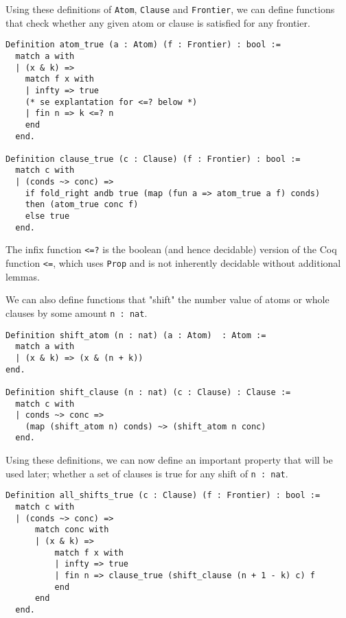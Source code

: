 Using these definitions of \lstinline{Atom}, \lstinline{Clause} and \lstinline{Frontier},
we can define functions that check whether any given atom or clause is satisfied for any frontier.

\begin{minipage}{\linewidth}
\begin{lstlisting}[language=Coq, label={lst:atom_clause_true_def}, caption={\lstinline{atom_true} and \lstinline{clause_true} in Coq}]
Definition atom_true (a : Atom) (f : Frontier) : bool :=
  match a with
  | (x & k) =>
    match f x with
    | infty => true
    (* se explantation for <=? below *)
    | fin n => k <=? n
    end
  end.

Definition clause_true (c : Clause) (f : Frontier) : bool :=
  match c with
  | (conds ~> conc) =>
    if fold_right andb true (map (fun a => atom_true a f) conds)
    then (atom_true conc f)
    else true
  end.
\end{lstlisting}
\end{minipage}

The infix function \lstinline{<=?} is the boolean (and hence decidable) version of the
Coq function \lstinline{<=}, which uses \lstinline{Prop} and is not inherently decidable without
additional lemmas.

We can also define functions that "shift" the number value of atoms or whole clauses by some amount \lstinline{n : nat}.

\begin{minipage}{\linewidth}
\begin{lstlisting}[language=Coq, label={lst:shift_atom_clause_true}, caption={\lstinline{shift_atom} and \lstinline{shift_clause} in Coq}]
Definition shift_atom (n : nat) (a : Atom)  : Atom :=
  match a with
  | (x & k) => (x & (n + k))
end.

Definition shift_clause (n : nat) (c : Clause) : Clause :=
  match c with
  | conds ~> conc =>
    (map (shift_atom n) conds) ~> (shift_atom n conc)
  end.
\end{lstlisting}
\end{minipage}

Using these definitions, we can now define an important property that will be used
later; whether a set of clauses is true for any shift of \lstinline{n : nat}.

\begin{minipage}{\linewidth}
\begin{lstlisting}[language=Coq, label={lst:all_shifts_true}, caption={\lstinline{all_shifts_true} in Coq}]
Definition all_shifts_true (c : Clause) (f : Frontier) : bool :=
  match c with
  | (conds ~> conc) =>
      match conc with
      | (x & k) =>
          match f x with
          | infty => true
          | fin n => clause_true (shift_clause (n + 1 - k) c) f
          end
      end
  end.
\end{lstlisting}
\end{minipage}

